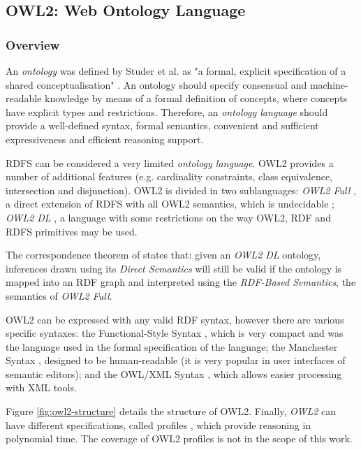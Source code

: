 \subsection{OWL2: Web Ontology Language}
\label{ch2:sec:semantic-web:owl}

\subsubsection{Overview}

An \emph{ontology} was defined by Studer et al. as "a formal, explicit specification of a shared conceptualisation" \autocite{Studer1998-kp}. An ontology should specify consensual and machine-readable knowledge by means of a formal definition of concepts, where concepts have explicit types and restrictions. Therefore, an \emph{ontology language} should provide a well-defined syntax, formal semantics, convenient and sufficient expressiveness and efficient reasoning support. 

\gls{RDFS} can be considered a very limited \emph{ontology language}. \gls{OWL2} \autocite{W3c_undated-dr} provides a number of additional features (e.g. cardinality constraints, class equivalence, intersection and disjunction). \gls{OWL2} is divided in two sublanguages: \emph{OWL2 Full} \autocite{W3c_undated-ae}, a direct extension of \gls{RDFS} with all \gls{OWL2} semantics, which is undecidable \autocite{Antoniou2012-nj}; \emph{OWL2 DL} \autocite{W3c_undated-xs}, a language with some restrictions on the way \gls{OWL2}, \gls{RDF} and \gls{RDFS} primitives may be used.

The correspondence theorem of \autocite{W3c_undated-xs} states that: given an \emph{OWL2 DL} ontology, inferences drawn using its \emph{Direct Semantics} will still be valid if the ontology is mapped into an RDF graph and interpreted using the \emph{RDF-Based Semantics}, the semantics of \emph{OWL2 Full}.

\gls{OWL2} can be expressed with any valid \gls{RDF} syntax, however there are various specific syntaxes: the Functional-Style Syntax \autocite{W3c_undated-xm}, which is very compact and was the language used in the formal specification of the language; the Manchester Syntax \autocite{W3c_undated-dg}, designed to be human-readable (it is very popular in user interfaces of semantic editors); and the OWL/XML Syntax \autocite{W3c_undated-gr}, which allows easier processing with \gls{XML} tools.

Figure \ref{fig:owl2-structure} details the structure of \gls{OWL2}. Finally, \emph{OWL2} can have different specifications, called profiles \autocite{W3c_undated-jk}, which provide reasoning in polynomial time. The coverage of \gls{OWL2} profiles is not in the scope of this work.

